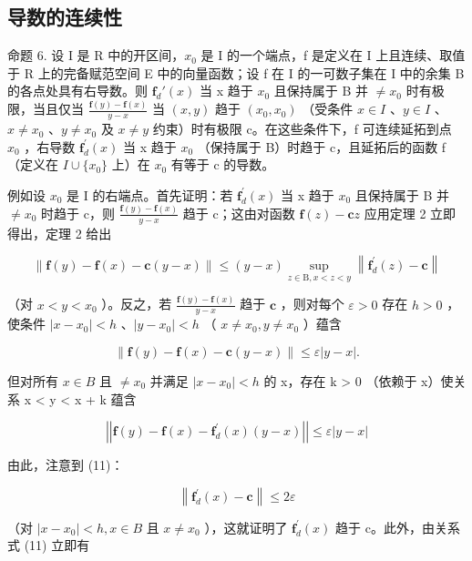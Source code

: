 \subsection{导数的连续性}

命题 6. 设 I 是 R 中的开区间，\(x_0\) 是 I 的一个端点，f 是定义在 I 上且连续、取值于 R 上的完备赋范空间 E 中的向量函数；设 f 在 I 的一可数子集在 I 中的余集 B 的各点处具有右导数。则 \(\mathbf{f}_d'(x)\) 当 x 趋于 \(x_0\) 且保持属于 B 并 \(\neq x_0\) 时有极限，当且仅当 \(\frac{\mathbf{f}(y) - \mathbf{f}(x)}{y - x}\) 当 \((x, y)\) 趋于 \((x_0, x_0)\) （受条件 \(x \in I\) 、\(y \in I\) 、\(x \neq x_0\) 、\(y \neq x_0\) 及 \(x \neq y\) 约束）时有极限 c。在这些条件下，f 可连续延拓到点 \(x_0\) ，右导数 \(\mathbf{f}_{d}^{\prime}(x)\) 当 x 趋于 \(x_{0}\) （保持属于 B）时趋于 c，且延拓后的函数 f （定义在 \(I \cup \{x_{0}\}\) 上）在 \(x_{0}\) 有等于 c 的导数。

例如设 \(x_{0}\) 是 I 的右端点。首先证明：若 \(\mathbf{f}_{d}^{\prime}(x)\) 当 x 趋于 \(x_{0}\) 且保持属于 B 并 \(\neq x_{0}\) 时趋于 c，则 \(\frac{\mathbf{f}(y)-\mathbf{f}(x)}{y-x}\) 趋于 c；这由对函数 \(\mathbf{f}(z)-\mathbf{c}z\) 应用定理 2 立即得出，定理 2 给出

\[
\| \mathbf {f} (y) - \mathbf {f} (x) - \mathbf {c} (y - x) \| \leqslant (y - x) \sup _ {z \in \mathrm{B}, x <   z <   y} \left\| \mathbf {f} _ {d} ^ {\prime} (z) - \mathbf {c} \right\|
\]

（对 \(x < y < x_0\) ）。反之，若 \(\frac{\mathbf{f}(y) - \mathbf{f}(x)}{y - x}\) 趋于 \(\mathbf{c}\) ，则对每个 \(\varepsilon > 0\) 存在 \(h > 0\) ，使条件 \(|x - x_0| < h\) 、\(|y - x_0| < h\) （ \(x \neq x_0, y \neq x_0\) ）蕴含

\[
\left\| \mathbf {f} (y) - \mathbf {f} (x) - \mathbf {c} (y - x) \right\| \leqslant \varepsilon | y - x |.\tag{11}
\]

但对所有 \(x \in B\) 且 \(\neq x_{0}\) 并满足 \(|x - x_{0}| < h\) 的 x，存在 k \textgreater{} 0 （依赖于 x）使关系 x \textless{} y \textless{} x + k 蕴含

\[
\left| \left| \mathbf {f} (y) - \mathbf {f} (x) - \mathbf {f} _ {d} ^ {\prime} (x) (y - x) \right| \right| \leqslant \varepsilon | y - x |\tag{12}
\]

由此，注意到 (11)：

\[
\left\| \mathbf {f} _ {d} ^ {\prime} (x) - \mathbf {c} \right\| \leqslant 2 \varepsilon
\]

（对 \(|x - x_{0}| < h, x \in B\) 且 \(x \neq x_{0}\) ），这就证明了 \(\mathbf{f}_{d}^{\prime}(x)\) 趋于 c。此外，由关系式 (11) 立即有


